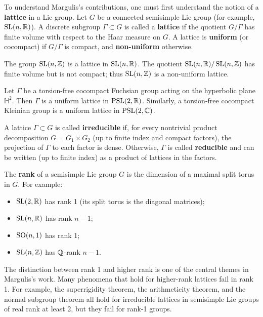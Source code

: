To understand Margulis's contributions, one must first understand the notion of a \textbf{lattice} in a Lie group. Let \(G\) be a connected semisimple Lie group (for example, \(\operatorname{SL}(n,\mathbb{R})\)). A discrete subgroup \(\Gamma \subset G\) is called a \textbf{lattice} if the quotient \(G/\Gamma\) has finite volume with respect to the Haar measure on \(G\). A lattice is \textbf{uniform} (or cocompact) if \(G/\Gamma\) is compact, and \textbf{non-uniform} otherwise.

\begin{example}
The group \(\operatorname{SL}(n,\mathbb{Z})\) is a lattice in \(\operatorname{SL}(n,\mathbb{R})\). The quotient \(\operatorname{SL}(n,\mathbb{R})/\operatorname{SL}(n,\mathbb{Z})\) has finite volume but is not compact; thus \(\operatorname{SL}(n,\mathbb{Z})\) is a non-uniform lattice.
\end{example}

\begin{example}
Let \(\Gamma\) be a torsion-free cocompact Fuchsian group acting on the hyperbolic plane \(\mathbb{H}^2\). Then \(\Gamma\) is a uniform lattice in \(\operatorname{PSL}(2,\mathbb{R})\). Similarly, a torsion-free cocompact Kleinian group is a uniform lattice in \(\operatorname{PSL}(2,\mathbb{C})\).
\end{example}

A lattice \(\Gamma \subset G\) is called \textbf{irreducible} if, for every nontrivial product decomposition \(G = G_1 \times G_2\) (up to finite index and compact factors), the projection of \(\Gamma\) to each factor is dense. Otherwise, \(\Gamma\) is called \textbf{reducible} and can be written (up to finite index) as a product of lattices in the factors.

The \textbf{rank} of a semisimple Lie group \(G\) is the dimension of a maximal split torus in \(G\). For example:
\begin{itemize}
    \item \(\operatorname{SL}(2,\mathbb{R})\) has rank 1 (its split torus is the diagonal matrices);
    \item \(\operatorname{SL}(n,\mathbb{R})\) has rank \(n-1\);
    \item \(\operatorname{SO}(n,1)\) has rank 1;
    \item \(\operatorname{SL}(n,\mathbb{Z})\) has \(\mathbb{Q}\)-rank \(n-1\).
\end{itemize}

The distinction between rank 1 and higher rank is one of the central themes in Margulis's work. Many phenomena that hold for higher-rank lattices fail in rank 1. For example, the superrigidity theorem, the arithmeticity theorem, and the normal subgroup theorem all hold for irreducible lattices in semisimple Lie groups of real rank at least 2, but they fail for rank-1 groups.

